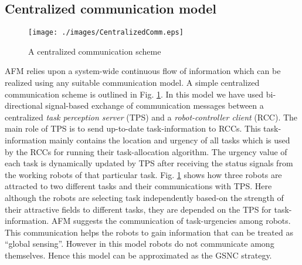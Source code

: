 \documentclass[journal]{IEEEtran}
\begin{document}
\subsection{Centralized communication model}
\begin{figure}
\centering
\texttt{[image: ./images/CentralizedComm.eps]}
\caption{\small A centralized communication scheme} %
\label{fig:ccm} %
\end{figure}
AFM relies upon a system-wide continuous flow of information which can be realized using any suitable communication model. A simple centralized communication scheme is outlined in Fig. \ref{fig:ccm}. In this model we have used bi-directional signal-based exchange of communication messages between a centralized \textit{task perception server} (TPS) and a \textit{robot-controller client} (RCC). The main role of TPS is to send up-to-date task-information to RCCs. This  task-information mainly contains the location and urgency of all tasks  which is used by the RCCs for running their task-allocation algorithm. The urgency value of each task is dynamically updated  by TPS after receiving the  status signals from the working robots of that particular task. Fig. \ref{fig:ccm} shows how three robots are attracted to two different tasks and their communications with TPS. Here although the robots are selecting task independently based-on the strength of their attractive fields to different tasks, they are depended on the TPS for task-information.
AFM suggests the communication of task-urgencies  among robots. This communication helps the robots to gain information that can be  treated as ``global sensing''. However in this model  robots do not communicate among themselves. Hence this model can be approximated as the GSNC strategy. 

\end{document}
